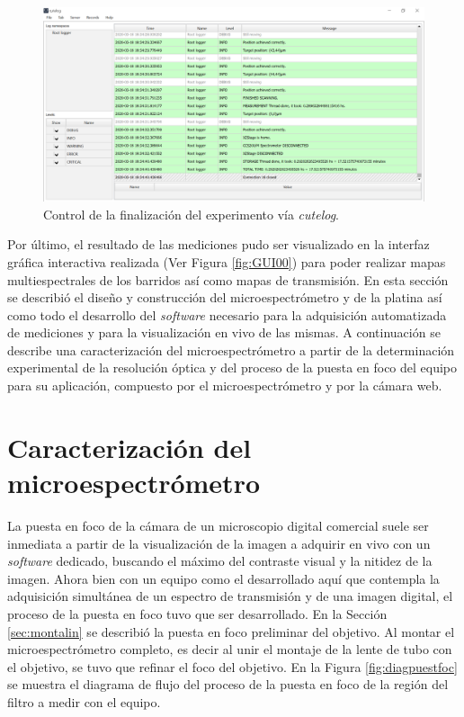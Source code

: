  \begin{figure}[H]
	\centering
	\includegraphics[width=1.0\textwidth]{Figs/microespectrometro/cute2.png}
	\caption{Control de la finalización del experimento vía \textit{cutelog}.}
	\label{fig:finit}
\end{figure}

Por último, el resultado de las mediciones pudo ser visualizado en la interfaz gráfica interactiva realizada (Ver Figura \ref{fig:GUI00}) para poder realizar mapas multiespectrales de los barridos así como mapas de transmisión.
En esta sección se describió el diseño y construcción del microespectrómetro y de la platina así como todo el desarrollo del \textit{software} necesario para la adquisición automatizada de mediciones y para la visualización en vivo de las mismas. A continuación se describe una caracterización del microespectrómetro a partir de la determinación experimental de la resolución óptica y del proceso de la puesta en foco del equipo para su aplicación, compuesto por el microespectrómetro y por la cámara web. 
 

\singlespacing
\section{Caracterización del microespectrómetro}
\label{sec:caractequipo}

\hspace{0.5cm}La puesta en foco de la cámara de un microscopio digital comercial suele ser inmediata a partir de la visualización de la imagen a adquirir en vivo con un \textit{software} dedicado, buscando el máximo del contraste visual y la nitidez de la imagen. Ahora bien con un equipo como el desarrollado aquí que contempla la adquisición simultánea de un espectro de transmisión y de una imagen digital, el proceso de la puesta en foco tuvo que ser desarrollado. En la Sección \ref{sec:montalin} se describió la puesta en foco preliminar del objetivo. Al montar el microespectrómetro completo, es decir al unir el montaje de la lente de tubo con el objetivo, se tuvo que refinar el foco del objetivo. En la Figura \ref{fig:diagpuestfoc} se muestra el diagrama de flujo del proceso de la puesta en foco de la región del filtro a medir con el equipo.

